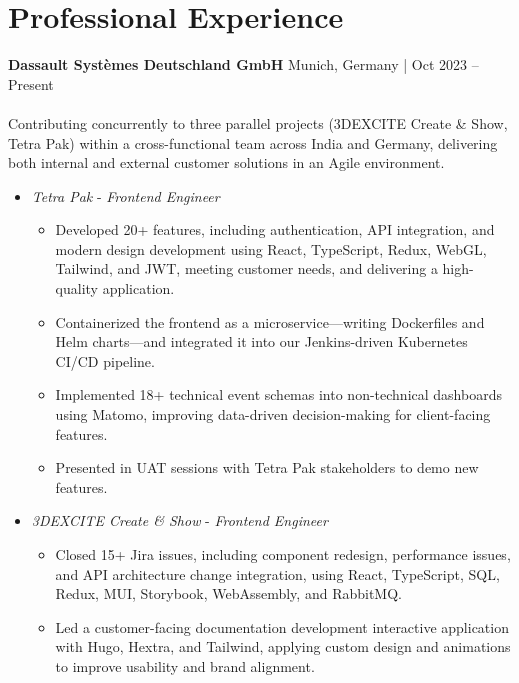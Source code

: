 \documentclass[a4paper,10pt]{article}
\begin{document}
\section*{Professional Experience}
\vspace{-0.8em}
\hline
\vspace{0.2em}

\textbf{Dassault Systèmes Deutschland GmbH} \hfill Munich, Germany | Oct 2023 -- Present \\
\\
Contributing concurrently to three parallel projects (3DEXCITE Create \& Show, Tetra Pak) within a cross-functional team across India and Germany, delivering both internal and external customer solutions in an Agile environment.
\begin{itemize}[leftmargin=*]
    \item \textit{Tetra Pak} - \textit{Frontend Engineer}
        \begin{itemize}[leftmargin=*]
            \item Developed 20+ features, including authentication, API integration, and modern design development using React, TypeScript, Redux, WebGL, Tailwind, and JWT, meeting customer needs, and delivering a high-quality application.
            \item Containerized the frontend as a microservice—writing Dockerfiles and Helm charts—and integrated it into our Jenkins-driven Kubernetes CI/CD pipeline.
            \item Implemented 18+ technical event schemas into non-technical dashboards using Matomo, improving data-driven decision-making for client-facing features.
            \item Presented in UAT sessions with Tetra Pak stakeholders to demo new features.
        \end{itemize}
    \item \textit{3DEXCITE Create \& Show} - \textit{Frontend Engineer}
        \begin{itemize}[leftmargin=*]
            \item Closed 15+ Jira issues, including component redesign, performance issues, and API architecture change integration, using React, TypeScript, SQL, Redux, MUI, Storybook, WebAssembly, and RabbitMQ.
            \item Led a customer-facing documentation development interactive application with Hugo, Hextra, and Tailwind, applying custom design and animations to improve usability and brand alignment.

\end{itemize}
\end{itemize}
\end{document}
